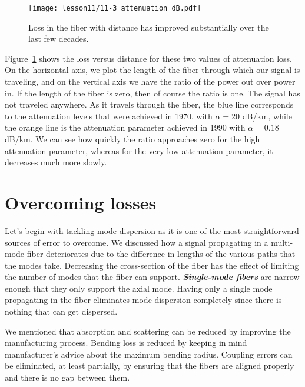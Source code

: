 \begin{figure}
    \centering
    \texttt{[image: lesson11/11-3\_attenuation\_dB.pdf]}
    \caption[Power loss in fiber.]{Loss in the fiber with distance has improved substantially over the last few decades.}
    \label{fig:11-3_attenuation_dB}
\end{figure}
Figure~\ref{fig:11-3_attenuation_dB} shows the loss versus distance for these two values of attenuation loss.
On the horizontal axis, we plot the length of the fiber through which our signal is traveling, and on the vertical axis we have the ratio of the power out over power in.
If the length of the fiber is zero, then of course the ratio is one.
The signal has not traveled anywhere.
As it travels through the fiber, the blue line corresponds to the attenuation levels that were achieved in 1970, with $\alpha=20$ dB/km, while the orange line is the attenuation parameter achieved in 1990 with $\alpha=0.18$ dB/km.
We can see how quickly the ratio approaches zero for the high attenuation parameter, whereas for the very low attenuation parameter, it decreases much more slowly.




\section{Overcoming losses}
\label{sec:11-4_overcoming_losses}

Let's begin with tackling mode dispersion as it is one of the most straightforward sources of error to overcome.
We discussed how a signal propagating in a multi-mode fiber deteriorates due to the difference in lengths of the various paths that the modes take.
Decreasing the cross-section of the fiber has the effect of limiting the number of modes that the fiber can support.
\textbf{\emph{Single-mode fibers}} are narrow enough that they only support the axial mode.
Having only a single mode propagating in the fiber eliminates mode dispersion completely since there is nothing that can get dispersed.

We mentioned that absorption and scattering can be reduced by improving the manufacturing process.
Bending loss is reduced by keeping in mind manufacturer's advice about the maximum bending radius.
Coupling errors can be eliminated, at least partially, by ensuring that the fibers are aligned properly and there is no gap between them.

